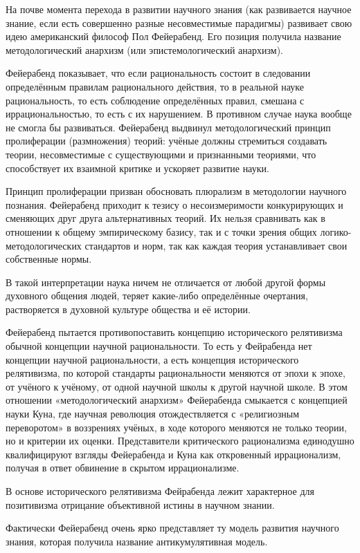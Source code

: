\documentclass[exam_answers.tex]{subfiles}
\begin{document}
\renewcommand{\baselinestretch}{0.75}

На почве момента перехода в развитии научного знания (как развивается научное знание, если есть совершенно разные несовместимые парадигмы) развивает свою идею американский философ Пол Фейерабенд.
Его позиция получила название методологический анархизм (или эпистемологический анархизм).

Фейерабенд показывает, что если рациональность состоит в следовании определённым правилам рационального действия, то в реальной науке рациональность, то есть соблюдение определённых правил, смешана с иррациональностью, то есть с их нарушением.
В противном случае наука вообще не смогла бы развиваться.
Фейерабенд выдвинул методологический принцип пролиферации (размножения) теорий: учёные должны стремиться создавать теории, несовместимые с существующими и признанными теориями, что способствует их взаимной критике и ускоряет развитие науки.

Принцип пролиферации призван обосновать плюрализм в методологии научного познания. Фейерабенд приходит к тезису о несоизмеримости конкурирующих и сменяющих друг друга альтернативных теорий.
Их нельзя сравнивать как в отношении к общему эмпирическому базису, так и с точки зрения общих логико-методологических стандартов и норм, так как каждая теория устанавливает свои собственные нормы.

В такой интерпретации наука ничем не отличается от любой другой формы духовного общения людей, теряет какие-либо определённые очертания, растворяется в духовной культуре общества и её истории.

Фейерабенд пытается противопоставить концепцию исторического релятивизма обычной концепции научной рациональности.
То есть у Фейрабенда нет концепции научной рациональности, а есть концепция исторического релятивизма, по которой стандарты рациональности меняются от эпохи к эпохе, от учёного к учёному, от одной научной школы к другой научной школе.
В этом отношении «методологический анархизм» Фейерабенда смыкается с концепцией науки Куна, где научная революция отождествляется с «религиозным переворотом» в воззрениях учёных, в ходе которого меняются не только теории, но и критерии их оценки.
Представители критического рационализма единодушно квалифицируют взгляды Фейерабенда и Куна как откровенный иррационализм, получая в ответ обвинение в скрытом иррационализме.

В основе исторического релятивизма Фейрабенда лежит характерное для позитивизма отрицание объективной истины в научном знании.

Фактически Фейерабенд очень ярко представляет ту модель развития научного знания, которая получила название антикумулятивная модель.
\end{document}
